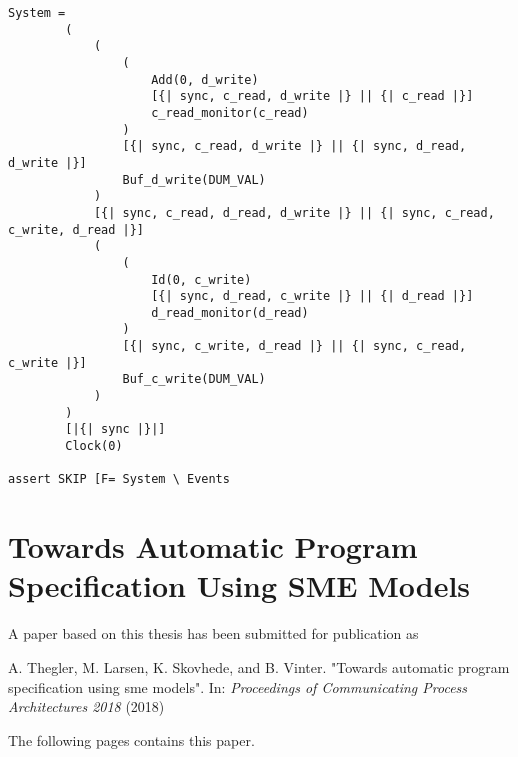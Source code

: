 \begin{verbatim}
System =
        (
            (
                (
                    Add(0, d_write)
                    [{| sync, c_read, d_write |} || {| c_read |}]
                    c_read_monitor(c_read)
                )
                [{| sync, c_read, d_write |} || {| sync, d_read, d_write |}]
                Buf_d_write(DUM_VAL)
            )
            [{| sync, c_read, d_read, d_write |} || {| sync, c_read, c_write, d_read |}]
            (
                (
                    Id(0, c_write)
                    [{| sync, d_read, c_write |} || {| d_read |}]
                    d_read_monitor(d_read)
                )
                [{| sync, c_write, d_read |} || {| sync, c_read, c_write |}]
                Buf_c_write(DUM_VAL)
            )
        )
        [|{| sync |}|]
        Clock(0)

assert SKIP [F= System \ Events
\end{verbatim}


\chapter{Towards Automatic Program Specification
Using SME Models}
\noindent A paper based on this thesis has been submitted for publication as

\begin{center}
\begin{minipage}{0.8\textwidth}
    A. Thegler, M. Larsen, K. Skovhede, and B. Vinter. "Towards automatic program specification using sme models". In: {\itshape Proceedings of Communicating Process Architectures
    2018} (2018)
\end{minipage}
\end{center}
The following pages contains this paper.
